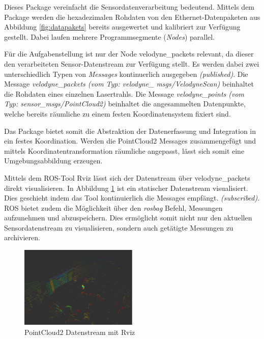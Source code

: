 Dieses Package vereinfacht die Sensordatenverarbeitung bedeutend. Mittels dem Package werden die hexadezimalen Rohdaten von den Ethernet-Datenpaketen aus Abbildung \ref{fig:datapakets} bereits ausgewertet und kalibriert zur Verfügung gestellt. Dabei laufen mehrere Programmsegmente (\textit{Nodes}) parallel. 

Für die Aufgabenstellung ist nur der Node velodyne\_packets relevant, da dieser den verarbeiteten Sensor-Datenstream zur Verfügung stellt. Es werden dabei zwei unterschiedlich Typen von \textit{Messages} kontinuerlich ausgegeben \textit{(published)}. Die Message \textit{velodyne\_packets (vom Typ: velodyne\_ msgs/VelodyneScan)} beinhaltet die Rohdaten eines einzelnen Lasertrahls. Die Message \textit{velodyne\_points (vom Typ: sensor\_msgs/PointCloud2)} beinhaltet die angesammelten Datenpunkte, welche bereits räumliche zu einem festen Koordinatensystem fixiert sind. 

Das Package bietet somit die Abstraktion der Datenerfassung und Integration in ein festes Koordination. Werden die PointCloud2 Messages zusammengefügt und mittels Koordinatentransformation räumliche angepasst, lässt sich somit eine Umgebungsabbildung erzeugen. 

Mittels dem ROS-Tool Rviz lässt sich der Datenstream über velodyne\_packets direkt visualisieren. In Abbildung \ref{fig:rviz} ist ein statischer Datenstream visualisiert. Dies geschieht indem das Tool kontinuierlich die Messages empfängt. \textit{(subscribed)}. ROS bietet zudem die Möglichkeit über den \textit{rosbag} Befehl, Messungen aufzunehmen und abzuspeichern. Dies ermöglicht somit nicht nur den aktuellen Sensordatenstream zu visualisieren, sondern auch getätigte Messungen zu archivieren.

\begin{figure}[H]
	\centering
	\includegraphics[width=0.5\textwidth]{resources/rviz.PNG}
	\caption[PointCloud2 Datenstream mit Rviz]{PointCloud2 Datenstream mit Rviz}
	\label{fig:rviz}
\end{figure} 


